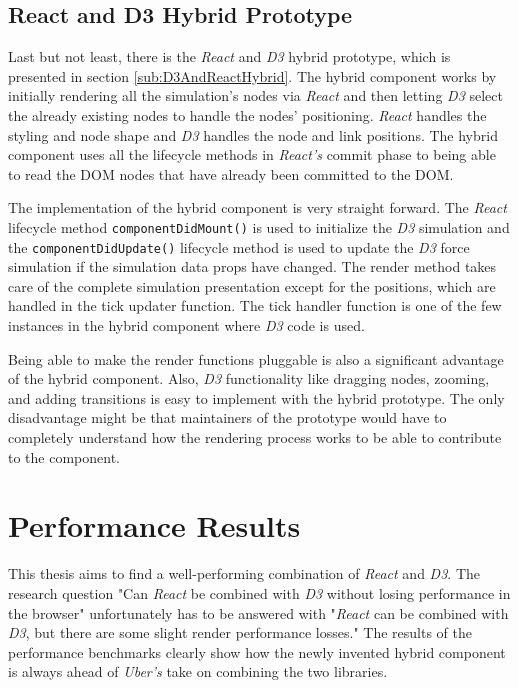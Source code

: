 \subsection{React and D3 Hybrid Prototype}

Last but not least, there is the \emph{React} and \emph{D3} hybrid prototype, which is presented in section \ref{sub:D3AndReactHybrid}. The hybrid component works by initially rendering all the simulation's nodes via \emph{React} and then letting \emph{D3} select the already existing nodes to handle the nodes' positioning. \emph{React} handles the styling and node shape and \emph{D3} handles the node and link positions. The hybrid component uses all the lifecycle methods in \emph{React's} commit phase to being able to read the DOM nodes that have already been committed to the DOM. 

The implementation of the hybrid component is very straight forward. The \emph{React} lifecycle method \texttt{componentDidMount()} is used to initialize the \emph{D3} simulation and the \texttt{componentDidUpdate()} lifecycle method is used to update the \emph{D3} force simulation if the simulation data props have changed. The render method takes care of the complete simulation presentation except for the positions, which are handled in the tick updater function. The tick handler function is one of the few instances in the hybrid component where \emph{D3} code is used.

Being able to make the render functions pluggable is also a sig\-nifi\-cant advantage of the hybrid component. Also, \emph{D3} functionality like dragging nodes, zooming, and adding transitions is easy to implement with the hybrid prototype. The only disadvantage might be that maintainers of the prototype would have to completely understand how the rendering process works to be able to contribute to the component.

\section{Performance Results}

This thesis aims to find a well-performing combination of \emph{React} and \emph{D3}. The research question "Can \emph{React} be combined with \emph{D3} without losing performance in the browser" unfortunately has to be answered with "\emph{React} can be combined with \emph{D3}, but there are some slight render performance losses." The results of the performance benchmarks clearly show how the newly invented hybrid component is always ahead of \emph{Uber's} take on combining the two libraries. 

